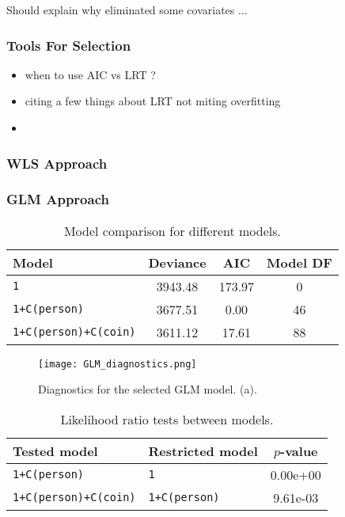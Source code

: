 \documentclass[a4paper, 12pt,oneside]{article}
\begin{document}
			Should explain why eliminated some covariates ...
			\subsubsection{Tools For Selection}
			\begin{itemize}
				\item when to use AIC vs LRT ?
				\item citing a few things about LRT not miting overfitting 
				\item 
			\end{itemize}
			\subsubsection{WLS Approach}

			\subsubsection{GLM Approach}
			\lipsum[1]
			\begin{table}[htb]
				\centering
				\caption{Model comparison for different models.}
				\label{tab:model-comparison}
				\begin{tabular}{lccc}
				\toprule
				Model & Deviance & AIC & Model DF \\
				\midrule
				\texttt{1} & 3943.48 & 173.97 & 0 \\
				\texttt{1+C(person)} & 3677.51 & 0.00 & 46 \\
				\texttt{1+C(person)+C(coin)} & 3611.12 & 17.61 & 88 \\
				\bottomrule
				\end{tabular}
			\end{table}
			\lipsum[1]
			\begin{figure}[htb]
				\centering
				\texttt{[image: GLM\_diagnostics.png]}
				\caption{Diagnostics for the selected GLM model. (a).}
				\label{fig:glm-diagnostic}
			\end{figure}
			\lipsum[1]
			\begin{table}[htb]
				\centering
				\caption{Likelihood ratio tests between models.}
				\label{tab:llr-comparison}
				\begin{tabular}{llc}
				\toprule
				Tested model & Restricted model & $p$-value \\
				\midrule
				\texttt{1+C(person)} & \texttt{1} & 0.00e+00 \\
				\texttt{1+C(person)+C(coin)} & \texttt{1+C(person)} & 9.61e-03 \\
				\bottomrule
				\end{tabular}
			\end{table}
\end{document}
